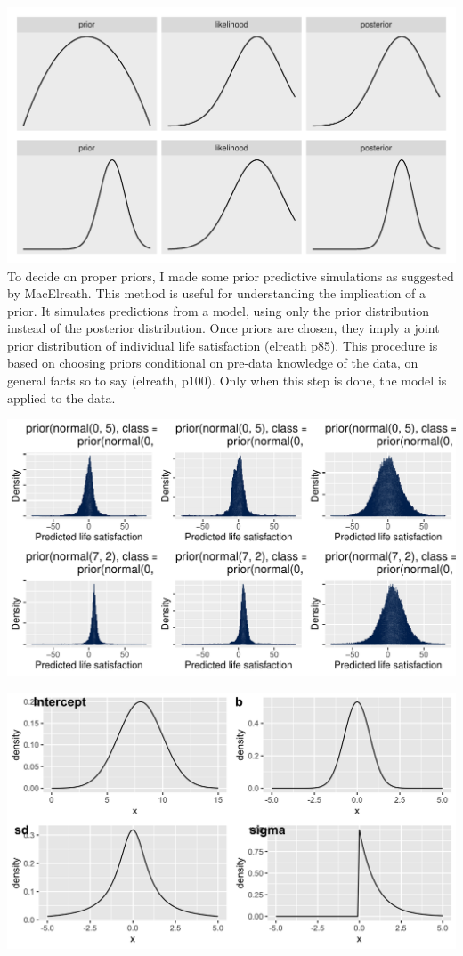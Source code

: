 \documentclass[a4, 12pt]{article}
\begin{document}
\includegraphics[width=1\linewidth]{../figures/flat_peaked}
To decide on proper priors, I made some prior predictive simulations as suggested by MacElreath. This method is useful for understanding the implication of a prior. It simulates predictions from a model, using only the prior distribution instead of the posterior distribution. Once priors are chosen, they imply a joint prior distribution of individual life satisfaction (elreath p85). This procedure is based on choosing priors conditional on pre-data knowledge of the data, on general facts so to say (elreath, p100). Only when this step is done, the model is applied to the data.

\includegraphics[width=1\linewidth]{../figures/lsat_predicted}

\includegraphics[width=1\linewidth]{../figures/chosen_priors}
\end{document}
